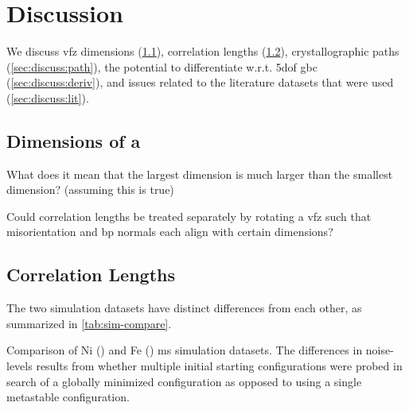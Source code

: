 \documentclass[final,twocolumn,12pt]{elsarticle}
\begin{document}
	\section{Discussion} \label{sec:discuss}
	
	We discuss \gls{vfz} dimensions (\cref{sec:discuss:dimensions}), correlation lengths (\cref{sec:discuss:correlation}), crystallographic paths (\cref{sec:discuss:path}), the potential to differentiate w.r.t. \gls{5dof} \gls{gbc} (\cref{sec:discuss:deriv}), and issues related to the literature datasets that were used (\cref{sec:discuss:lit}).
	
	\subsection{Dimensions of a } \label{sec:discuss:dimensions}
	What does it mean that the largest dimension is much larger than the smallest dimension? (assuming this is true)
	
	Could correlation lengths be treated separately by rotating a \gls{vfz} such that misorientation and \gls{bp} normals each align with certain dimensions?
	
	\subsection{Correlation Lengths} \label{sec:discuss:correlation}
	The two simulation datasets have distinct differences from each other, as summarized in \cref{tab:sim-compare}.
	\begin{table}[htb!]
	    \centering
	    \caption{Comparison of Ni (\citet{olmstedSurveyComputedGrain2009}) and Fe (\citet{kimPhasefieldModeling3D2014}) \gls{ms} simulation datasets. The differences in noise-levels results from whether multiple initial starting configurations were probed in search of a globally minimized configuration as opposed to using a single metastable configuration. }
\label{tab:sim-compare}
	\end{table}
	
\end{document}
